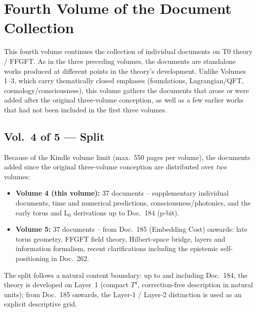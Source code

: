 
\section*{Fourth Volume of the Document Collection}

This fourth volume continues the collection of individual documents on T0
theory / FFGFT. As in the three preceding volumes, the documents are
standalone works produced at different points in the theory's development.
Unlike Volumes 1--3, which carry thematically closed emphases (foundations,
Lagrangian/QFT, cosmology/consciousness), this volume gathers the documents
that arose or were added after the original three-volume conception, as well
as a few earlier works that had not been included in the first three volumes.

\subsection*{Vol.~4 of 5 --- Split}

Because of the Kindle volume limit (max.\ 550 pages per volume), the
documents added since the original three-volume conception are distributed
over \emph{two} volumes:

\begin{itemize}
\item \textbf{Volume 4 (this volume):} 37 documents -- supplementary
      individual documents, time and numerical predictions,
      consciousness/photonics, and the early torus and L$_0$ derivations
      up to Doc.~184 (p-bit).
\item \textbf{Volume 5:} 37 documents -- from Doc.~185 (Embedding Cost)
      onwards: late torus geometry, FFGFT field theory, Hilbert-space
      bridge, layers and information formalism, recent clarifications
      including the epistemic self-positioning in Doc.~262.
\end{itemize}

The split follows a natural content boundary: up to and including Doc.~184,
the theory is developed on Layer~1 (compact $T^4$, correction-free
description in natural units); from Doc.~185 onwards, the Layer-1 /
Layer-2 distinction is used as an explicit descriptive grid.

